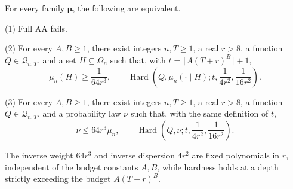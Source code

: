 \begin{theorem}\label{ian:hard-sector-aa-equivalence}
For every family \(\symbf{\mu}\), the following are equivalent.

\par\noindent(1) Full AA fails.

\par\noindent(2) For every \(A,B\ge1\), there exist integers \(n,T\ge1\), a real \(r>8\), a function
\(Q\in\mathcal Q_{n,T}\), and a set \(H\subseteq\Omega_n\) such that, with \(t=\lceil A(T+r)^B\rceil+1\),
\[
 \mu_n(H)\ge\frac1{64r^3}, \qquad \operatorname{Hard}\left( Q,\mu_n(\cdot\mid H); t,\frac1{4r^2},\frac1{16r^2}\right).
\]

\par\noindent(3) For every \(A,B\ge1\), there exist integers \(n,T\ge1\), a real \(r>8\), a function
\(Q\in\mathcal Q_{n,T}\), and a probability law \(\nu\) such that, with the same definition of \(t\),
\[
 \nu\le64r^3\mu_n, \qquad \operatorname{Hard}\left( Q,\nu;t,\frac1{4r^2},\frac1{16r^2}\right).
\]

\par\noindent
The inverse weight \(64r^3\) and inverse dispersion \(4r^2\) are fixed polynomials in \(r\), independent of the
budget constants \(A,B\), while hardness holds at a depth strictly exceeding the budget \(A(T+r)^B\).
\end{theorem}
